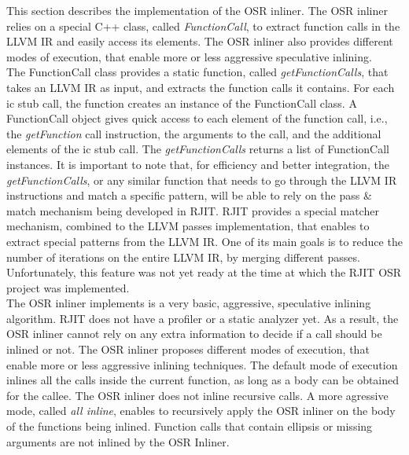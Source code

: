 This section describes the implementation of the OSR inliner.
The OSR inliner relies on a special C++ class, called \textit{FunctionCall}, to extract function calls in the LLVM IR and easily access its elements. 
The OSR inliner also provides different modes of execution, that enable more or less aggressive speculative inlining.\\

The FunctionCall class provides a static function, called \textit{getFunctionCalls}, that takes an LLVM IR as input, and extracts the function calls it contains.
For each ic stub call, the function creates an instance of the FunctionCall class. 
A FunctionCall object gives quick access to each element of the function call, i.e., the \textit{getFunction} call instruction, the arguments to the call, and the additional elements of the ic stub call.
The \textit{getFunctionCalls} returns a list of FunctionCall instances.
It is important to note that, for efficiency and better integration, the \textit{getFunctionCalls}, or any similar function that needs to go through the LLVM IR instructions and match a specific pattern, will be able to rely on the pass \& match mechanism being developed in RJIT.
RJIT provides a special matcher mechanism, combined to the LLVM passes implementation, that enables to extract special patterns from the LLVM IR.
One of its main goals is to reduce the number of iterations on the entire LLVM IR, by merging different passes.
Unfortunately, this feature was not yet ready at the time at which the RJIT OSR project was implemented.\\

The OSR inliner implements is a very basic, aggressive, speculative inlining algorithm. 
RJIT does not have a profiler or a static analyzer yet.
As a result, the OSR inliner cannot rely on any extra information to decide if a call should be inlined or not.
The OSR inliner proposes different modes of execution, that enable more or less aggressive inlining techniques.
The default mode of execution inlines all the calls inside the current function, as long as a body can be obtained for the callee.
The OSR inliner does not inline recursive calls.
A more agressive mode, called \textit{all inline}, enables to recursively apply the OSR inliner on the body of the functions being inlined.
Function calls that contain ellipsis or missing arguments are not inlined by the OSR Inliner.
\\


